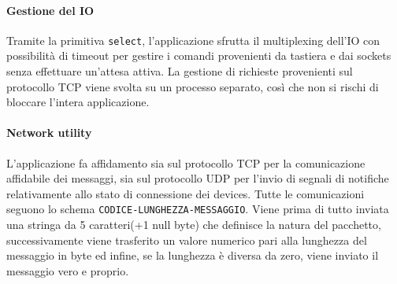 \documentclass[11pt,a4paper,twocolumn,twoside]{paper}
\begin{document}
\paragraph{Gestione del IO}
Tramite la primitiva \texttt{select}, l'applicazione sfrutta il
    multiplexing dell'IO con possibilità di timeout per gestire i
    comandi provenienti da tastiera e dai sockets senza effettuare
    un'attesa attiva. La gestione di richieste provenienti sul
    protocollo TCP viene svolta su un processo separato, così che non si
    rischi di bloccare l'intera applicazione.
\paragraph{Network utility}
	L'applicazione fa affidamento sia sul protocollo TCP per la
    comunicazione affidabile dei messaggi, sia sul protocollo UDP per
    l'invio di segnali di notifiche relativamente allo stato di
    connessione dei devices. Tutte le comunicazioni seguono lo schema
    \texttt{CODICE-LUNGHEZZA-MESSAGGIO}. Viene prima di tutto inviata
    una stringa da 5 caratteri(+1 null byte) che definisce la natura del
    pacchetto, successivamente viene trasferito un valore numerico pari
    alla lunghezza del messaggio in byte ed infine, se la lunghezza è
    diversa da zero, viene inviato il messaggio vero e proprio.
\end{document}
